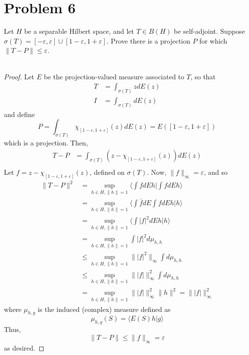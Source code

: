 \documentclass[fontsize=11pt]{scrartcl} %
\numberwithin{equation}{section} %
\numberwithin{figure}{section} %
\numberwithin{table}{section} %
\begin{document}
\section*{Problem 6}
Let $H$ be a separable Hilbert space, and let $T\in B(H)$ be self-adjoint.
Suppose $\sigma(T) = [-\varepsilon,\varepsilon]\cup
[1-\varepsilon,1+\varepsilon]$. Prove there is a projection $P$ for which
$\|T-P\|\leq \varepsilon$.
\\
\\
\begin{proof}
    Let $E$ be the projection-valued measure associated to $T$, so that
    \[
\begin{aligned}
    T &= \int_{\sigma(T)}zdE(z)\\
    I &= \int_{\sigma(T)}dE(z)
\end{aligned}
    \]
    and define
    \[
        P = \int_{\sigma(T)}\chi_{[1-\varepsilon,1+\varepsilon]}(z)dE(z)
        = E([1-\varepsilon,1+\varepsilon])
    \]
    which is a projection. Then,
    \[
        \begin{aligned}
            T-P &=
            \int_{\sigma(T)}(z-\chi_{[1-\varepsilon,1+\varepsilon]}(z))dE(z)\\
        \end{aligned}
    \]
    Let $f=z-\chi_{[1-\varepsilon,1+\varepsilon]}(z)$, defined on $\sigma(T)$.
    Now, $\|f\|_{\infty} = \varepsilon$, and so
    \[
        \begin{aligned}
        \|T-P\|^2 &= \sup_{h\in H,\|h\|=1}\langle \int fdE h|\int fdE h\rangle\\
        &=\sup_{h\in H,\|h\|=1}\langle\int \bar{f}dE\int fdE h|h\rangle\\
        &=\sup_{h\in H,\|h\|=1}\langle \int |f|^2dE h|h\rangle\\
        &=\sup_{h\in H,\|h\|=1}\int |f|^2d\mu_{h,h}\\
        &\leq \sup_{h\in H,\|h\|=1}\||f|^2\|_{\infty}\int d\mu_{h,h}\\
        &\leq \sup_{h\in H,\|h\|=1}\||f|\|^2_{\infty}\int d\mu_{h,h}\\
        &= \sup_{h\in H,\|h\|=1}\||f|\|^2_{\infty}\|h\|^2 = \||f|\|^2_{\infty}
    \end{aligned}
    \]
    where $\mu_{h,g}$ is the induced (complex) measure defined as
    \[
        \mu_{h,g}(S) = \langle E(S)h|g\rangle
    \]
    Thus,
    \[
        \|T-P\|\leq \|f\|_{\infty} = \varepsilon
    \]
    as desired.
\end{proof}
\end{document}
